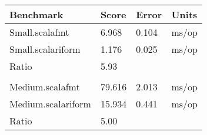 \begin{tabular}{llll}
  Benchmark              &     Score &     Error &  Units\\
  \hline
  \hline
  Small.scalafmt         &     6.968 &    0.104 &  ms/op\\
  Small.scalariform      &     1.176 &    0.025 &  ms/op\\
  \hline
  Ratio            &   5.93   &  &    \\
  \\
  Medium.scalafmt        &    79.616 &    2.013 &  ms/op\\
  Medium.scalariform     &    15.934 &    0.441 &  ms/op\\
\hline
  Ratio            &   5.00   &  &
\end{tabular}
